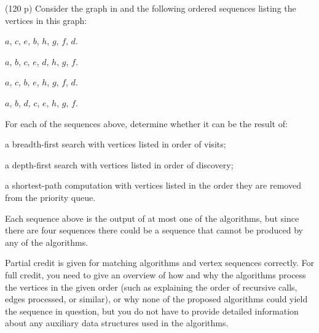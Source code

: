 \documentclass{jn-pset}
\begin{document}
\begin{problem}%
  \label{problem:graph-algorithm-outputs}%
  (120 p)
  Consider the graph in   
  and the following ordered sequences listing the vertices in this graph:
  \begin{compactenum}
  \item%
    \label{sequence-dijkstra}%
    $a$, $c$, $e$, $b$, $h$, $g$, $f$, $d$.

%           
        
  \item%
    \label{sequence-bfs}%
    $a$, $b$, $c$, $e$, $d$, $h$, $g$, $f$.

  \item%
    \label{sequence-spoiler}%
    $a$, $c$, $b$, $e$, $h$, $g$, $f$, $d$.
        
  \item%
    \label{sequence-dfs}%
    $a$, $b$, $d$, $c$, $e$, $h$, $g$, $f$.
    
  \end{compactenum}
  For each of the sequences above, determine whether it can be the result of:
  \begin{compactenum}[(a)]
  \item
    a breadth-first search with vertices listed in order of visits;
    
  \item
    a depth-first search with vertices listed in order of discovery;
    
  \item
    a shortest-path computation with vertices listed in the order they
    are removed from the priority queue.

  \end{compactenum}
%
  Each sequence above is the output of at most one of the algorithms,
  but since there are four sequences there could be a sequence that
  cannot be produced by any of the algorithms.

  Partial credit is given for matching algorithms and vertex sequences correctly.
%
  For full credit, you need to
  give an overview of how and why the
  algorithms process the vertices in the given order
  (such as explaining the order of recursive calls, edges processed,
  or similar),
  or why none of the proposed algorithms could yield the sequence in
  question,  
  but you do not have to provide detailed information about any
  auxiliary data structures used in the algorithms.


\end{problem}
\end{document}
